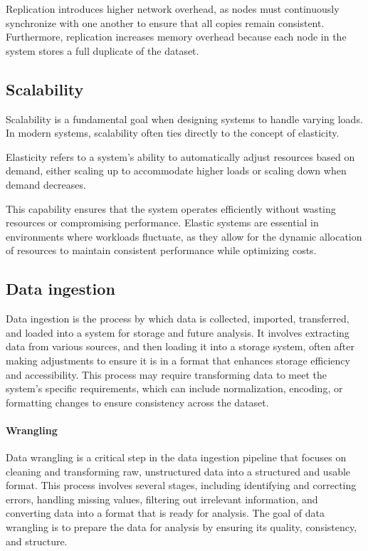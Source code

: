 Replication introduces higher network overhead, as nodes must continuously synchronize with one another to ensure that all copies remain consistent.
Furthermore, replication increases memory overhead because each node in the system stores a full duplicate of the dataset. 

\subsection{Scalability}
Scalability is a fundamental goal when designing systems to handle varying loads. 
In modern systems, scalability often ties directly to the concept of elasticity.
\begin{definition}
    Elasticity refers to a system's ability to automatically adjust resources based on demand, either scaling up to accommodate higher loads or scaling down when demand decreases.
\end{definition}
\noindent This capability ensures that the system operates efficiently without wasting resources or compromising performance. 
Elastic systems are essential in environments where workloads fluctuate, as they allow for the dynamic allocation of resources to maintain consistent performance while optimizing costs.

\subsection{Data ingestion}
Data ingestion is the process by which data is collected, imported, transferred, and loaded into a system for storage and future analysis. 
It involves extracting data from various sources, and then loading it into a storage system, often after making adjustments to ensure it is in a format that enhances storage efficiency and accessibility.
This process may require transforming data to meet the system's specific requirements, which can include normalization, encoding, or formatting changes to ensure consistency across the dataset.

\paragraph*{Wrangling}
Data wrangling is a critical step in the data ingestion pipeline that focuses on cleaning and transforming raw, unstructured data into a structured and usable format. 
This process involves several stages, including identifying and correcting errors, handling missing values, filtering out irrelevant information, and converting data into a format that is ready for analysis. 
The goal of data wrangling is to prepare the data for analysis by ensuring its quality, consistency, and structure.